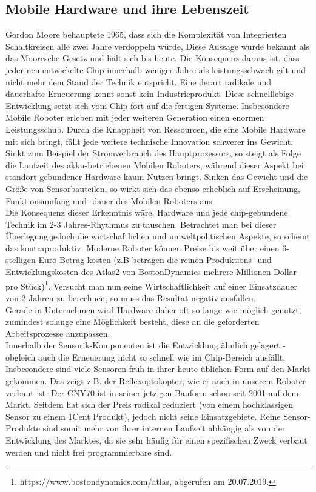 \documentclass[twoside,11pt, a4paper]{report}
\begin{document}
	
	
	\subsection{Mobile Hardware und ihre Lebenszeit}
	Gordon Moore behauptete 1965, dass sich die Komplexität von Integrierten Schaltkreisen alle zwei Jahre verdoppeln würde, \cite{Moore1965} Diese Aussage wurde bekannt als das Mooresche Gesetz und hält sich bis heute. Die Konsequenz daraus ist, dass jeder neu entwickelte Chip innerhalb weniger Jahre als leistungsschwach gilt und nicht mehr dem Stand der Technik entspricht. Eine derart radikale und dauerhafte Erneuerung kennt sonst kein Industrieprodukt. Diese schnelllebige Entwicklung setzt sich vom Chip fort auf die fertigen Systeme. Insbesondere Mobile Roboter erleben mit jeder weiteren Generation einen enormen Leistungsschub. Durch die Knappheit von Ressourcen, die eine Mobile Hardware mit sich bringt, fällt jede weitere technische Innovation schwerer ins Gewicht. Sinkt zum Beispiel der Stromverbrauch des Hauptprozessors, so steigt als Folge die Laufzeit des akku-betriebenen Mobilen Roboters, während dieser Aspekt bei standort-gebundener Hardware kaum Nutzen bringt. Sinken das Gewicht und die Größe von Sensorbauteilen, so wirkt sich das ebenso erheblich auf Erscheinung, Funktionsumfang und -dauer des Mobilen Roboters aus. \\
	Die Konsequenz dieser Erkenntnis wäre, Hardware und jede chip-gebundene Technik im 2-3 Jahres-Rhythmus zu tauschen. Betrachtet man bei dieser Überlegung jedoch die wirtschaftlichen und umweltpolitischen Aspekte, so scheint das kontraproduktiv. Moderne Roboter können Preise bis weit über einen 6-stelligen Euro Betrag kosten (z.B betragen die reinen Produktions- und Entwicklungskosten des Atlas2 von BostonDynamics mehrere Millionen Dollar pro Stück)\footnote{https://www.bostondynamics.com/atlas, abgerufen am 20.07.2019.}. Versucht man nun seine Wirtschaftlichkeit auf einer Einsatzdauer von 2 Jahren zu berechnen, so muss das Resultat negativ ausfallen. \\
	Gerade in Unternehmen wird Hardware daher oft so lange wie möglich genutzt, zumindest solange eine Möglichkeit besteht, diese an die geforderten Arbeitsprozesse anzupassen. \\
	
	Innerhalb der Sensorik-Komponenten ist die Entwicklung ähnlich gelagert - obgleich auch die Erneuerung nicht so schnell wie im Chip-Bereich ausfällt. Insbesondere sind viele Sensoren früh in ihrer heute üblichen Form auf den Markt gekommen. Das zeigt z.B. der Reflexoptokopter, wie er auch in unserem Roboter verbaut ist. Der CNY70 ist in seiner jetzigen Bauform schon seit 2001 auf dem Markt. Seitdem hat sich der Preis radikal reduziert (von einem hochklassigen Sensor zu einem 1Cent Produkt), jedoch nicht seine Einsatzgebiete. Reine Sensor-Produkte sind somit mehr von ihrer internen Laufzeit abhängig als von der Entwicklung des Marktes, da sie sehr häufig für einen spezifischen Zweck verbaut werden und nicht frei programmierbare sind. 
	
\end{document}
